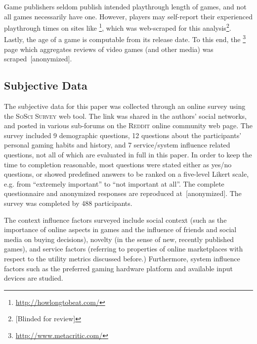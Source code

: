 Game publishers seldom publish intended playthrough
length of games, and not all games necessarily have one. However, players
may self-report their experienced playthrough times on sites like
\hltb\footnote{\url{http://howlongtobeat.com/}}, which was web-scraped
for this analysis\footnote{[Blinded for review]}.
Lastly, the age of a game is computable from its release date. To this end, the
\metacritic\footnote{\url{http://www.metacritic.com/}} page which
aggregates reviews of video games (and other media) was
scraped~[anonymized].



\subsection{Subjective Data}

The subjective data for this paper was collected through an online
survey using the \textsc{SoSci Survey} web tool. The link was shared
in the authors' social networks, and posted in various sub-forums on
the \textsc{Reddit} online community web page.
The survey included 9 demographic questions, 12 questions about the
participants' personal gaming habits and history, and 7 service/system
influence related questions, not all of which are evaluated in full
in this paper.
In order to keep the time to completion reasonable, most questions
were stated either as yes/no questions, or showed predefined answers
to be ranked on a five-level Likert scale, e.g. from ``extremely
important'' to ``not important at all''.
The complete questionnaire and anonymized responses
are reproduced at~[anonymized].
The survey was completed by 488 participants.

The context influence factors surveyed include social context (such
as the importance of online aspects in games and the influence of
friends and social media on buying decisions), novelty (in the sense
of new, recently published games), and service factors (referring to
properties of online marketplaces with respect to the utility metrics
discussed before.) Furthermore, system influence factors such as
the preferred gaming hardware platform and available input devices
are studied.
